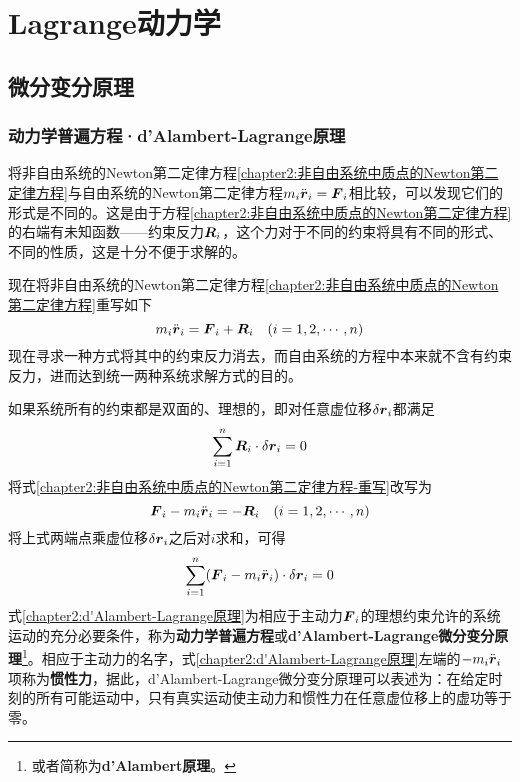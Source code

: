 \chapter{Lagrange动力学}

\section{微分变分原理}\label{chapter2:section-微分变分原理}

\subsection{动力学普遍方程·d'Alambert-Lagrange原理}

将非自由系统的Newton第二定律方程\eqref{chapter2:非自由系统中质点的Newton第二定律方程}与自由系统的Newton第二定律方程$m_i\ddot{\boldsymbol{r}}_i=\boldsymbol{F}_i$相比较，可以发现它们的形式是不同的。这是由于方程\eqref{chapter2:非自由系统中质点的Newton第二定律方程}的右端有未知函数——约束反力$\boldsymbol{R}_i$，这个力对于不同的约束将具有不同的形式、不同的性质，这是十分不便于求解的。

现在将非自由系统的Newton第二定律方程\eqref{chapter2:非自由系统中质点的Newton第二定律方程}重写如下
\begin{equation}
	m_i\ddot{\boldsymbol{r}}_i = \boldsymbol{F}_i+\boldsymbol{R}_i\quad (i=1,2,\cdots,n)
	\label{chapter2:非自由系统中质点的Newton第二定律方程-重写}
\end{equation}
现在寻求一种方式将其中的约束反力消去，而自由系统的方程中本来就不含有约束反力，进而达到统一两种系统求解方式的目的。

如果系统所有的约束都是双面的、理想的，即对任意虚位移$\delta\boldsymbol{r}_i$都满足
\begin{equation}
	\sum_{i=1}^n\boldsymbol{R}_i \cdot \delta\boldsymbol{r}_i=0
	\label{chapter2:理想约束假设-重写}
\end{equation}
将式\eqref{chapter2:非自由系统中质点的Newton第二定律方程-重写}改写为
\begin{equation*}
	\boldsymbol{F}_i - m_i \ddot{\boldsymbol{r}}_i = -\boldsymbol{R}_i \quad (i=1,2,\cdots,n)
\end{equation*}
将上式两端点乘虚位移$\delta\boldsymbol{r}_i$之后对$i$求和，可得
\begin{equation}
	\sum_{i=1}^n(\boldsymbol{F}_i - m_i \ddot{\boldsymbol{r}}_i) \cdot \delta \boldsymbol{r}_i = 0
	\label{chapter2:d'Alambert-Lagrange原理}
\end{equation}
式\eqref{chapter2:d'Alambert-Lagrange原理}为相应于主动力$\boldsymbol{F}_i$的理想约束允许的系统运动的充分必要条件，称为{\bf 动力学普遍方程}或{\bf d'Alambert-Lagrange微分变分原理}\footnote{或者简称为{\bf d'Alambert原理}。}。相应于主动力的名字，式\eqref{chapter2:d'Alambert-Lagrange原理}左端的$-m_i\ddot{\boldsymbol{r}}_i$项称为{\bf 惯性力}，据此，d'Alambert-Lagrange微分变分原理可以表述为：在给定时刻的所有可能运动中，只有真实运动使主动力和惯性力在任意虚位移上的虚功等于零。


